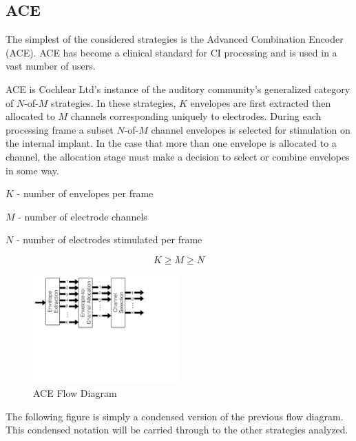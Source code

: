 \documentclass [11pt, proquest] {uwthesis}[2015/03/03]
\begin{document}
\subsection{ACE}\label{ss:ACE}

The simplest of the considered strategies is the Advanced Combination Encoder (ACE).  ACE has become a clinical standard for CI processing and is used in a vast number of users.

ACE is Cochlear Ltd's instance of the auditory community's generalized category of $N$-of-$M$ strategies.  In these strategies, $K$ envelopes are first extracted then allocated to $M$ channels corresponding uniquely to electrodes.  During each processing frame a subset $N$-of-$M$ channel envelopes is selected for stimulation on the internal implant.  In the case that more than one envelope is allocated to a channel, the allocation stage must make a decision to select or combine envelopes in some way.

$K$ - number of envelopes per frame

$M$ - number of electrode channels

$N$ - number of electrodes stimulated per frame

$$K \geq M \geq N$$

\begin{figure}[!ht]
  \centering
    \includegraphics[width=0.5\textwidth]{ACE_flow_diagram_explicit}   
    \caption{ACE Flow Diagram}
\end{figure}

The following figure is simply a condensed version of the previous flow diagram.  This condensed notation will be carried through to the other strategies analyzed.
\end{document}
